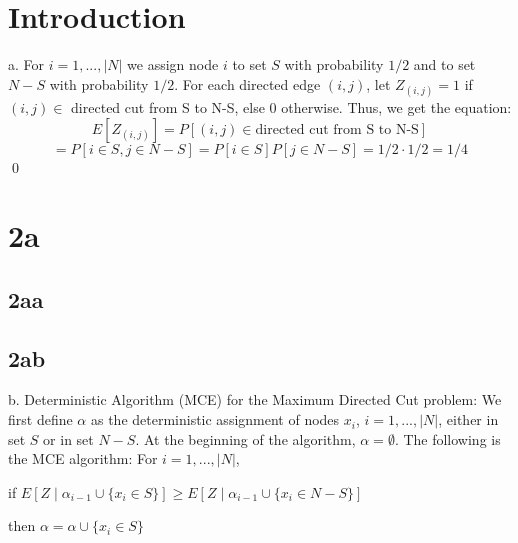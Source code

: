 \documentclass[oneside]{projectpaper} %
\begin{document}
\maketitle
\begin{abstract}
  This is an example SIAM \LaTeX\ article. This can be used as a
  template for new articles.  Abstracts must be able to stand alone
  and so cannot contain citations to the paper's references,
  equations, etc.  An abstract must consist of a single paragraph and
  be concise. Because of online formatting, abstracts must appear as
  plain as possible. Any equations should be inline.
\end{abstract}
\section{Introduction}
{\large a.} For $i = 1,...,|N|$ we assign node $i$ to set $S$ with probability $1/2$ and to set $N-S$ with probability $1/2$. For each directed edge $(i, j)$, let $Z_{(i,j)} = 1$ if $(i, j) \in$ directed cut from S to N-S, else 0 otherwise. Thus, we get the equation: $$E[Z_{(i,j)}] = P[(i,j) \in \text{directed cut from S to N-S}]$$ $$= P[i \in S, j \in N-S] = P[i \in  S]P[j \in N-S] = 1/2 \cdot 1/2 = 1/4$$ \hfill\qed
\section{2a}
\subsection{2aa}
\subsection{2ab}
{\large b.} Deterministic Algorithm (MCE) for the Maximum Directed Cut problem:
\newline
We first define $\alpha$ as the deterministic assignment of nodes $x_i$, $i = 1,...,|N|$, either in set $S$ or in set $N-S$. At the beginning of the algorithm, $\alpha = \emptyset$. The following is the MCE algorithm:
\newline
For $i = 1,...,|N|$,  \newline

if $E[Z \mid \alpha_{i-1} \cup \{x_i \in S\}] \geq E[Z \mid \alpha_{i-1} \cup \{x_i \in N-S\}]$  \newline

\quad \quad then $\alpha = \alpha \cup \{x_i \in S\}$ \newline
\end{document}
